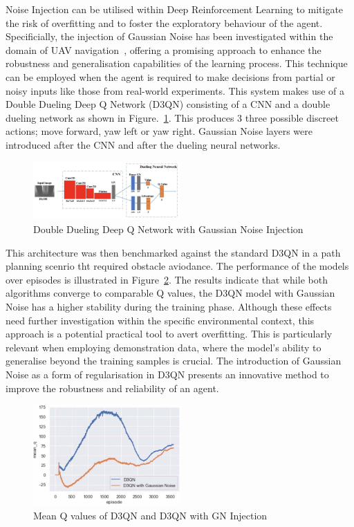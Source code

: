 Noise Injection can be utilised within Deep Reinforcement Learning to mitigate the risk of overfitting and to foster the exploratory behaviour of the agent.
Specificially, the injection of Gaussian Noise has been investigated within the domain of UAV navigation~\cite{fyp13-noise-injection}, offering a promising approach to enhance the robustness and generalisation capabilities of the learning process.
This technique can be employed when the agent is required to make decisions from partial or noisy inputs like those from real-world experiments.
This system makes use of a Double Dueling Deep Q Network (D3QN) consisting of a CNN and a double dueling network as shown in Figure.~\ref{fig:fyp13-d3qn-noise}.
This produces 3 three possible discreet actions; move forward, yaw left or yaw right.
Gaussian Noise layers were introduced after the CNN and after the dueling neural networks.

\begin{figure}[htbp]
  \centering
  \includegraphics[width=0.5\textwidth]{background/fyp13-noise-injection.png}
  \caption{Double Dueling Deep Q Network with Gaussian Noise Injection}
\label{fig:fyp13-d3qn-noise}
\end{figure}

This architecture was then benchmarked against the standard D3QN in a path planning scenrio tht required obstacle aviodance.
The performance of the models over episodes is illustrated in Figure~\ref{fig:fyp13-results}.
The results indicate that while both algorithms converge to comparable Q values, the D3QN model with Gaussian Noise has a higher stability during the training phase.
Although these effects need further investigation within the specific environmental context, this approach is a potential practical tool to avert overfitting. 
This is particularly relevant when employing demonstration data, where the model's ability to generalise beyond the training samples is crucial. 
The introduction of Gaussian Noise as a form of regularisation in D3QN presents an innovative method to improve the robustness and reliability of an agent.

\begin{figure}[H]
  \centering
  \includegraphics[width=0.5\textwidth]{background/fyp13-noise-results.png}
  \caption{Mean Q values of D3QN and D3QN with GN Injection}
\label{fig:fyp13-results}
\end{figure}

